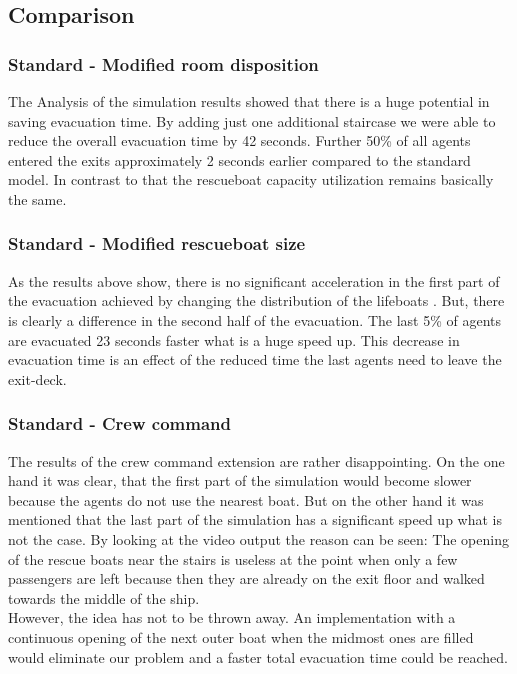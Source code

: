 \documentclass[11pt]{article}
\begin{document}
\subsection{Comparison}
\subsubsection{Standard - Modified room disposition}
The Analysis of the simulation results showed that there is a huge potential in saving evacuation time. By adding just one additional staircase we were able to reduce the overall evacuation time by 42 seconds. Further 50\% of all agents entered the exits approximately 2 seconds earlier compared to the standard model. In contrast to that the rescueboat capacity utilization remains basically the same.
\subsubsection{Standard - Modified rescueboat size}

As the results above show, there is no significant acceleration in the first part of the evacuation achieved by changing the distribution of the lifeboats .  
But, there is clearly a difference in the second half of the evacuation. The last 5\% of agents are evacuated 23 seconds faster what is a huge speed up.
This decrease in evacuation time is an effect of the reduced time the last agents need to leave the exit-deck.

\subsubsection{Standard - Crew command}
The results of the crew command extension are rather disappointing. On the one hand it was clear, that the first part of the simulation would become slower because the agents do not use the nearest boat. But on the other hand it was mentioned that the last part of the simulation has a significant speed up what is not the case. By looking at the video output the reason can be seen: The opening of the rescue boats near the stairs is useless at the point when only a few passengers are left because then they are already on the exit floor and walked towards the middle of the ship.\\
However, the idea has not to be thrown away. An implementation with a continuous opening of the next outer boat when the midmost ones are filled would eliminate our problem and a faster total evacuation time could be reached.
\end{document}
